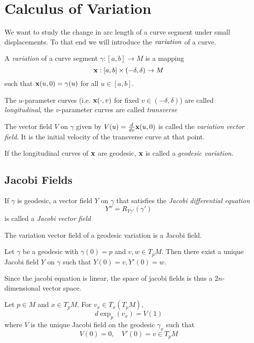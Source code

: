 \section{Calculus of Variation}
We want to study the change in arc length of a curve segment under small displacements. To that end we will introduce the $\emph{variation}$ of a curve.
\begin{definition}A \emph{variation} of a curve segment $\gamma:[a,b]\to M$ is a mapping \[
\mathbf{x}:[a,b]\times(-\delta,\delta) \to M
\]
such that $\mathbf{x}(u,0)=\gamma(u)$ for all $u\in [a,b]$.

The $u$-parameter curves (i.e. $\mathbf{x}(\cdot,v)$ for fixed $v\in(-\delta,\delta)$) are called \emph{longitudinal}, the $v$-parameter curves are called \emph{transverse}

The vector field $V$ on $\gamma$ given by $V(u) = \frac{d}{dv}\mathbf{x}(u,0)$ is called the \emph{variation vector field}. It is the initial velocity of the transverse curve at that point.

If the longitudinal curves of $\mathbf{x}$ are geodesic, $\mathbf{x}$ is called a \emph{geodesic variation}.

\subsection{Jacobi Fields}
\end{definition}
\begin{definition}
If $\gamma$ is geodesic, a vector field $Y$ on $\gamma$ that satisfies the \emph{Jacobi differential equation}
\[
Y'' = R_{Y\gamma'}(\gamma')
\]
is called a \emph{Jacobi vector field}
\end{definition}

\begin{proposition}
The variation vector field of a geodesic variation is a Jacobi field.
\end{proposition}

\begin{lemma}
Let $\gamma$ be a geodesic with $\gamma(0)=p$ and $v,w\in T_pM$. Then there exist a unique Jacobi field $Y$ on $\gamma$ such that $Y(0)=v, Y'(0)=w$.
\end{lemma}
Since the jacobi equation is linear, the space of jacobi fields is thus a $2n$-dimensional vector space.

\begin{proposition}Let $p\in M$ and $x\in T_pM$. For $v_x\in T_x(T_pM)$, 
\[
d \exp_p(v_x) = V(1)
\]
where $V$ is the unique Jacobi field on the geodesic $\gamma_x$ such that
\[
V(0) = 0, \quad V'(0) = v\in T_pM
\]
\end{proposition}

